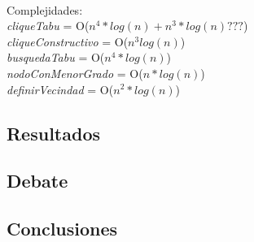 \paragraph{}
Complejidades:  \\
\textit{cliqueTabu} = O($n^4*log(n) + n^3*log(n)???$) \\
\tab \textit{cliqueConstructivo} = O($n^3 log(n)$) \\
\tab \textit{busquedaTabu} = O($n^4*log(n)$) \\
\tab \tab \textit{nodoConMenorGrado} = O($n*log(n)$) \\
\tab \tab \textit{definirVecindad} = O($n^2*log(n)$) \\

\subsection{Resultados}
\subsection{Debate}
\subsection{Conclusiones}
